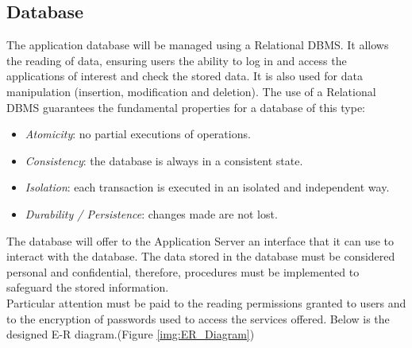 \subsection{Database}
The application database will be managed using a Relational DBMS.
It allows the reading of data, ensuring users the ability to log in and access the applications of interest and check the stored data.
It is also used for data manipulation (insertion, modification and deletion).
The use of a Relational DBMS guarantees the fundamental properties for a database of this type:
\begin{itemize}
  \item \textit{Atomicity}: no partial executions of operations.
  \item \textit{Consistency}: the database is always in a consistent state.
  \item \textit{Isolation}: each transaction is executed in an isolated and independent way.
  \item \textit{Durability / Persistence}: changes made are not lost.
\end{itemize}
The database will offer to the Application Server an interface that it can use to interact with the database.
The data stored in the database must be considered personal and confidential, therefore, procedures must be implemented to safeguard the stored information.\\
Particular attention must be paid to the reading permissions granted to users and to the encryption of passwords used to access the services offered.
Below is the designed E-R diagram.(Figure \ref{img:ER_Diagram})

